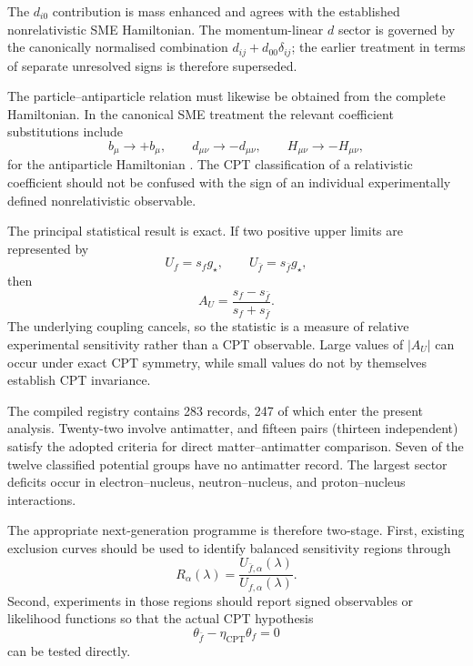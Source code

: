 \documentclass[aps,prd,reprint,superscriptaddress,nofootinbib]{revtex4-2}
\newcommand{\CPT}{\mathrm{CPT}}
\begin{document}
	The $d_{i0}$ contribution is mass enhanced and agrees with the
	established nonrelativistic SME Hamiltonian. The momentum-linear
	$d$ sector is governed by the canonically normalised combination
	$d_{ij}+d_{00}\delta_{ij}$; the earlier treatment in terms of separate
	unresolved signs is therefore superseded.
	
	The particle--antiparticle relation must likewise be obtained from the
	complete Hamiltonian. In the canonical SME treatment the relevant
	coefficient substitutions include
	\begin{equation}
		b_\mu\rightarrow+b_\mu,
		\qquad
		d_{\mu\nu}\rightarrow-d_{\mu\nu},
		\qquad
		H_{\mu\nu}\rightarrow-H_{\mu\nu},
	\end{equation}
	for the antiparticle Hamiltonian \cite{KosteleckyLane1999}. The CPT
	classification of a relativistic coefficient should not be confused
	with the sign of an individual experimentally defined nonrelativistic
	observable.
	
	The principal statistical result is exact. If two positive upper
	limits are represented by
	\begin{equation}
		U_f=s_f g_\star,
		\qquad
		U_{\bar f}=s_{\bar f}g_\star,
	\end{equation}
	then
	\begin{equation}
		A_U
		=
		\frac{s_f-s_{\bar f}}
		{s_f+s_{\bar f}}.
	\end{equation}
	The underlying coupling cancels, so the statistic is a measure of
	relative experimental sensitivity rather than a CPT observable.
	Large values of $|A_U|$ can occur under exact CPT symmetry, while
	small values do not by themselves establish CPT invariance.
	
	The compiled registry contains 283 records, 247 of which enter the present analysis. Twenty-two involve antimatter, and fifteen pairs (thirteen independent) satisfy the adopted criteria for direct matter--antimatter comparison. Seven of the twelve classified potential groups have no antimatter record. The
	largest sector deficits occur in electron--nucleus, neutron--nucleus,
	and proton--nucleus interactions.
	
	The appropriate next-generation programme is therefore two-stage.
	First, existing exclusion curves should be used to identify balanced
	sensitivity regions through
	\begin{equation}
		R_\alpha(\lambda)
		=
		\frac{U_{\bar f,\alpha}(\lambda)}
		{U_{f,\alpha}(\lambda)}.
	\end{equation}
	Second, experiments in those regions should report signed observables
	or likelihood functions so that the actual CPT hypothesis
	\begin{equation}
		\theta_{\bar f}-\eta_\CPT\theta_f=0
	\end{equation}
	can be tested directly.
	
\end{document}
